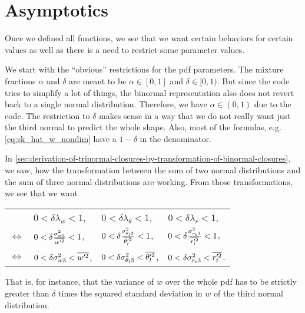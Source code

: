 \chapter{Asymptotics}\label{ch:asymptotics}

Once we defined all functions,
we see that we want certain behaviors for certain values as well as
there is a need to restrict some parameter values.

We start with the \enquote{obvious} restrictions for the \gls{pdf} parameters.
The mixture fractions $\alpha$ and $\delta$ are meant to be $\alpha \in [0,1]$ and $\delta \in [0,1)$.
But since the code tries to simplify a lot of things,
the binormal representation also does not revert back to a single normal distribution.
Therefore, we have $\alpha \in (0,1)$ due to the code.
The restriction to $\delta$ makes sense in a way
that we do not really want just the third normal to predict the whole shape.
Also, most of the formulas, e.g. \cref{eq:sk_hat_w_nondim} have a $1-\delta$ in the denominator.

In \cref{sec:derivation-of-trinormal-closures-by-transformation-of-binormal-closures},
we saw,
how the transformation between the sum of two normal distributions
and the sum of three normal distributions are working.
From those transformations, we see that we want
\begin{table}[!htb]
    \centering
    \begin{tabular}{llll}
        &
        $0 < \delta\lambda_w < 1$, &
        $0 < \delta\lambda_\theta < 1$, &
        $0 < \delta\lambda_r < 1$, \\
        $\iff$ &
        $0 < \delta\frac{\sigma_{w3}^2}{\overline{w'^2}} < 1$, &
        $0 < \delta\frac{\sigma_{\theta_l 3}^2}{\overline{\theta_l'^2}} < 1$, &
        $0 < \delta\frac{\sigma_{r_t 3}^2}{\overline{r_t'^2}} < 1$, \\
        $\iff$ &
        $0 < \delta\sigma_{w3}^2 < \overline{w'^2}$, &
        $0 < \delta\sigma_{\theta_l 3}^2 < \overline{\theta_l'^2}$, &
        $0 < \delta\sigma_{r_t 3}^2 < \overline{r_t'^2}$.
    \end{tabular}
    \label{tab:table_asymp_2}
\end{table}

That is, for instance,
that the variance of $w$ over the whole \gls{pdf} has to be strictly greater than $\delta$ times
the squared standard deviation in $w$ of the third normal distribution.

